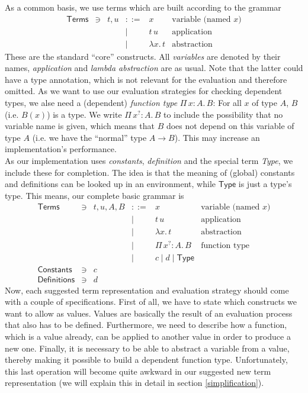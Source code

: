 \documentclass[12pt, a4paper, titlepage]{article}
\newcommand{\sspace}{\,}
\newcommand{\type}{\mathsf{Type}}
\newcommand{\la}{\lambda}
\newcommand{\ApA}[2]{#1 \sspace #2}
\newcommand{\LaA}[2]{\la {#1}. \sspace #2}
\newcommand{\PiA}[3]{\Pi \sspace #1:#2 . \sspace #3}
\begin{document}
As a common basis, we use terms which are built according to the grammar
\[
\begin{array}{lllrll}
\mathsf{Terms}       & \ni & t,u & ::= & x & \mbox{variable (named $x$)} \\
			                   &&& \mid & \ApA t u & \mbox{application} \\
			                   &&& \mid & \LaA x t & \mbox{abstraction} 
\end{array}
\]
These are the standard ``core'' constructs. All \emph{variables} are denoted by their names, \emph{application} and \emph{lambda abstraction} are as usual. 
Note that the latter could have a type annotation, which is not relevant for the evaluation and therefore omitted. As we want to use our evaluation strategies for checking dependent types, we alse need a (dependent) \emph{function type} $\PiA{x}{A}{B}$: For all $x$ of type $A$, $B$ (i.e. $B(x)$) is a type. We write $\PiA{x^?}{A}{B}$ to include the possibility that no variable name is given, which means that $B$ does not depend on this variable of type $A$ (i.e. we have the ``normal'' type $A \rightarrow B$). This may increase an implementation's performance.
\\
As our implementation uses \emph{constants}, \emph{definition} and the special term \emph{Type}, we include these for completion. The idea is that the meaning of (global) constants and definitions can be looked up in an environment, while $\type$ is just a type's type. This means, our complete basic grammar is
\[
\begin{array}{lllrll}
\mathsf{Terms}       & \ni & t,u, A, B & ::= & x & \mbox{variable (named $x$)} \\
			                   &&& \mid & \ApA t u & \mbox{application} \\
			                   &&& \mid & \LaA x t & \mbox{abstraction} \\
			                   &&& \mid & \PiA {x^?} A B & \mbox{function type} \\ 
					   &&& \mid & c \mid d \mid \type \\
\mathsf{Constants}   & \ni & c &&&  \\
\mathsf{Definitions} & \ni & d &&& 
\end{array}
\]
Now, each suggested term representation and evaluation strategy should come with a couple of specifications. 
First of all, we have to state which constructs we want to allow as values. Values are basically the result of an evaluation process that also has to be defined. Furthermore, we need to describe how a function, which is a value already, can be applied to another value in order to produce a new one. Finally, it is necessary to be able to abstract a variable from a value, thereby making it possible to build a dependent function type.
Unfortunately, this last operation will become quite awkward in our suggested new term representation (we will explain this in detail in section \ref{simplification}). 
\end{document}
